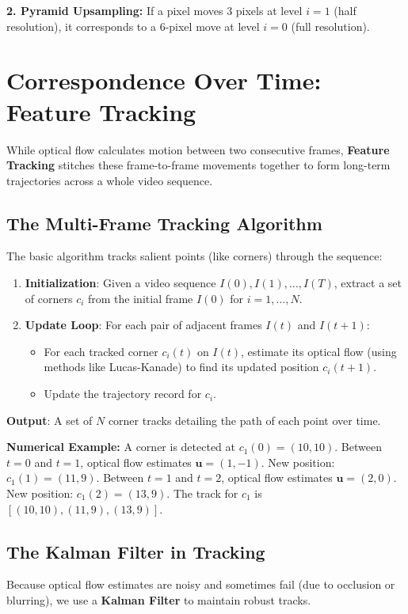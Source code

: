 \documentclass{report}
\begin{document}
\textbf{2. Pyramid Upsampling:} If a pixel moves 3 pixels at level $i=1$ (half resolution), it corresponds to a 6-pixel move at level $i=0$ (full resolution).




\chapter{Correspondence Over Time: Feature Tracking}
While optical flow calculates motion between two consecutive frames, \textbf{Feature Tracking} stitches these frame-to-frame movements together to form long-term trajectories across a whole video sequence.

\section{The Multi-Frame Tracking Algorithm}
The basic algorithm tracks salient points (like corners) through the sequence:
\begin{enumerate}
    \item \textbf{Initialization}: Given a video sequence $I(0), I(1), \dots, I(T)$, extract a set of corners $c_i$ from the initial frame $I(0)$ for $i = 1, \dots, N$.
    \item \textbf{Update Loop}: For each pair of adjacent frames $I(t)$ and $I(t+1)$:
          \begin{itemize}
              \item For each tracked corner $c_i(t)$ on $I(t)$, estimate its optical flow (using methods like Lucas-Kanade) to find its updated position $c_i(t+1)$.
              \item Update the trajectory record for $c_i$.
          \end{itemize}
\end{enumerate}
\textbf{Output}: A set of $N$ corner tracks detailing the path of each point over time.

\textbf{Numerical Example:}
A corner is detected at $c_1(0) = (10, 10)$.
Between $t=0$ and $t=1$, optical flow estimates $\mathbf{u} = (1, -1)$. New position: $c_1(1) = (11, 9)$.
Between $t=1$ and $t=2$, optical flow estimates $\mathbf{u} = (2, 0)$. New position: $c_1(2) = (13, 9)$.
The track for $c_1$ is $[(10,10), (11,9), (13,9)]$.

\section{The Kalman Filter in Tracking}
Because optical flow estimates are noisy and sometimes fail (due to occlusion or blurring), we use a \textbf{Kalman Filter} to 
maintain robust tracks.
\end{document}
